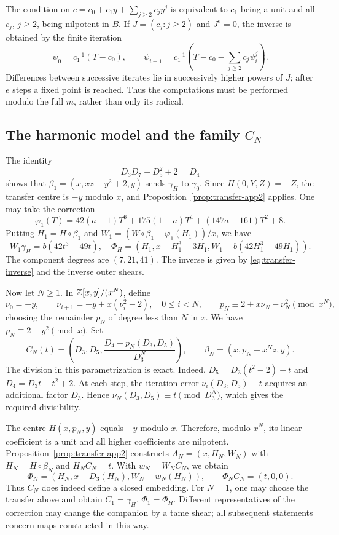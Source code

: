 The condition on $c=c_0+c_1y+\sum_{j\ge2}c_jy^j$ is equivalent to
$c_1$ being a unit and all $c_j$, $j\ge2$, being nilpotent in $B$.
If $J=(c_j:j\ge2)$ and $J^e=0$, the inverse is obtained by the finite iteration
\[
 \psi_0=c_1^{-1}(T-c_0),\qquad
 \psi_{i+1}=c_1^{-1}\left(T-c_0-\sum_{j\ge2}c_j\psi_i^j\right).
\]
Differences between successive iterates lie in successively higher powers
of $J$; after $e$ steps a fixed point is reached. Thus the computations
must be performed modulo the full $m$, rather than only its radical.

\subsection{The harmonic model and the family $C_N$}\label{subsec:family-app2}
The identity
\[
 D_3D_7-D_5^2+2=D_4
\]
shows that $\beta_1=(x,xz-y^2+2,y)$ sends $\gamma_H$ to
$\gamma_0$. Since $H(0,Y,Z)=-Z$, the transfer centre is $-y$
modulo $x$, and Proposition~\ref{prop:transfer-app2} applies.
One may take the correction
\[
 \varphi_1(T)=42(a-1)T^6+175(1-a)T^4+(147a-161)T^2+8.
\]
Putting $H_1=H\circ\beta_1$ and
$W_1=(W\circ\beta_1-\varphi_1(H_1))/x$, we have
\[
 W_1\gamma_H=b(42t^3-49t),\quad
 \Phi_H=(H_1,x-H_1^3+3H_1,W_1-b(42H_1^3-49H_1)).
\]
The component degrees are $(7,21,41)$. The inverse is given by
\eqref{eq:transfer-inverse} and the inverse outer shears.

Now let $N\ge1$. In ${\mathbb Z}[x,y]/(x^N)$, define
\[
 \nu_0=-y,\qquad \nu_{i+1}=-y+x(\nu_i^2-2),\quad 0\le i<N,
 \qquad p_N\equiv2+x\nu_N-\nu_N^2\pmod{x^N},
\]
choosing the remainder $p_N$ of degree less than $N$ in $x$.
We have $p_N\equiv2-y^2\pmod x$. Set
\begin{equation}\label{eq:family-CN}
 C_N(t)=\left(D_3,D_5,
 \frac{D_4-p_N(D_3,D_5)}{D_3^N}\right),\qquad
 \beta_N=(x,p_N+x^Nz,y).
\end{equation}
The division in this parametrization is exact. Indeed,
$D_5=D_3(t^2-2)-t$ and $D_4=D_3t-t^2+2$.
At each step, the iteration error $\nu_i(D_3,D_5)-t$ acquires an
additional factor $D_3$. Hence
$\nu_N(D_3,D_5)\equiv t\pmod{D_3^N}$, which gives the required divisibility.

The centre $H(x,p_N,y)$ equals $-y$ modulo $x$. Therefore, modulo $x^N$,
its linear coefficient is a unit and all higher coefficients are nilpotent.
Proposition~\ref{prop:transfer-app2} constructs $A_N=(x,H_N,W_N)$ with
$H_N=H\circ\beta_N$ and $H_NC_N=t$. With $w_N=W_NC_N$, we obtain
\begin{equation}\label{eq:family-rectifier}
 \Phi_N=(H_N,x-D_3(H_N),W_N-w_N(H_N)),\qquad
 \Phi_NC_N=(t,0,0).
\end{equation}
Thus $C_N$ does indeed define a closed embedding.
For $N=1$, one may choose the transfer above and obtain
$C_1=\gamma_H$, $\Phi_1=\Phi_H$. Different representatives of the
correction may change the companion by a tame shear; all subsequent
statements concern maps constructed in this way.

